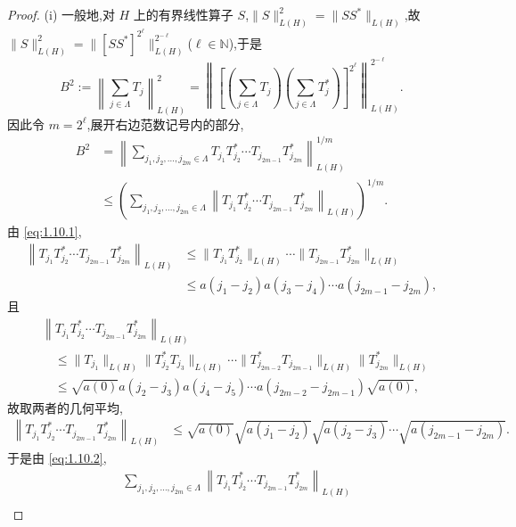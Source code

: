 \begin{proof}
(i) 一般地,对 $H$ 上的有界线性算子 $S$,$\| S \|_{L(H)}^{2} = \| SS^{*} \|_{L(H)}$,故 $\| S \|_{L(H)}^{2} = \| [SS^{*}]^{2^{\ell}} \|_{L(H)}^{2^{-\ell}}$($\ell \in \mathbb{N}$),于是
\begin{equation*}
B^{2} := \left\| \sum_{j \in \Lambda}T_{j} \right\|_{L(H)}^{2} = \left\| \left[\left(\sum_{j \in \Lambda}T_{j}\right)\left(\sum_{j \in \Lambda}T_{j}^{*}\right)\right]^{2^{\ell}} \right\|_{L(H)}^{2^{-\ell}}.
\end{equation*}
因此令 $m = 2^{\ell}$,展开右边范数记号内的部分,
\begin{equation}\tag{1.10.3}\begin{aligned}
B^{2} &= \left\| \displaystyle\sum_{j_{1}, j_{2}, \dots, j_{2m} \in \Lambda}T_{j_{1}}T_{j_{2}}^{*}\cdots T_{j_{2m-1}}T_{j_{2m}}^{*} \right\|_{L(H)}^{1/m} \\
&\leq \left(\displaystyle\sum_{j_{1}, j_{2}, \dots, j_{2m} \in \Lambda}\left\| T_{j_{1}}T_{j_{2}}^{*}\cdots T_{j_{2m-1}}T_{j_{2m}}^{*} \right\|_{L(H)}\right)^{1/m}.
\end{aligned}\label{eq:1.10.3}\end{equation}
由 \eqref{eq:1.10.1},
\begin{align*}
\left\| T_{j_{1}}T_{j_{2}}^{*}\cdots T_{j_{2m-1}}T_{j_{2m}}^{*} \right\|_{L(H)} & \leq \| T_{j_{1}}T_{j_{2}}^{*} \|_{L(H)}\cdots\| T_{j_{2m-1}}T_{j_{2m}}^{*} \|_{L(H)} \\
& \leq a(j_{1} - j_{2})a(j_{3} - j_{4})\cdots a(j_{2m-1} - j_{2m}),
\end{align*}
且
\begin{align*}
& \left\| T_{j_{1}}T_{j_{2}}^{*}\cdots T_{j_{2m-1}}T_{j_{2m}}^{*} \right\|_{L(H)} \\
& \quad \leq \| T_{j_{1}} \|_{L(H)}\| T_{j_{2}}^{*}T_{j_{3}} \|_{L(H)}\cdots\| T_{j_{2m-2}}^{*}T_{j_{2m-1}} \|_{L(H)}\| T_{j_{2m}}^{*} \|_{L(H)} \\
& \quad \leq \sqrt{a(0)}a(j_{2} - j_{3})a(j_{4} - j_{5})\cdots a(j_{2m-2} - j_{2m-1})\sqrt{a(0)},
\end{align*}
故取两者的几何平均,
\begin{align*}
\left\| T_{j_{1}}T_{j_{2}}^{*}\cdots T_{j_{2m-1}}T_{j_{2m}}^{*} \right\|_{L(H)}&\leq \sqrt{a(0)}\sqrt{a(j_{1} - j_{2})}\sqrt{a(j_{2} - j_{3})}\cdots\sqrt{a(j_{2m-1} - j_{2m})}.
 \end{align*}
于是由 \eqref{eq:1.10.2},
\begin{align*}
& \displaystyle\sum_{j_{1}, j_{2}, \ldots, j_{2m} \in \Lambda}\left\| T_{j_{1}}T_{j_{2}}^{*}\cdots T_{j_{2m-1}}T_{j_{2m}}^{*} \right\|_{L(H)} \\

\end{align*}
\end{proof}
